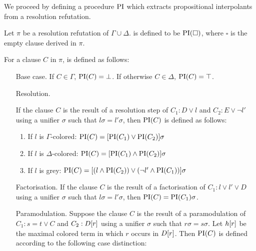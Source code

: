 We proceed by defining a procedure $\operatorname{PI}$ which extracts propositional interpolants from a resolution refutation.

\begin{defi}
	Let $\pi$ be a resolution refutation of $\Gamma \cup \Delta$.
	 is defined to be $\operatorname{PI}(\square)$, where $\square$ is the empty clause derived in $\pi$.

	For a clause $C$ in $\pi$,  is defined as follows:
	\label{def:PI}
	\begin{itemize}
		\item[Base case.]
			If $C \in \Gamma$, $\operatorname{PI}(C) = \bot$. 
			If otherwise $C \in \Delta$, $\operatorname{PI}(C) = \top$. 
		\item[Resolution.]
			\label{def:PI_resolution}

			If the clause $C$ is the result of a resolution step of $C_1: D \lor l$ and $C_2: E \lor \lnot l'$ using a unifier $\sigma$ such that $l\sigma = l'\sigma$, then $\operatorname{PI}(C)$ is defined as follows:
			\begin{enumerate}
				\item If $l$ is $\Gamma$-colored: $\operatorname{PI}(C) = [\operatorname{PI}(C_1) \lor \operatorname{PI}(C_2)]\sigma$
				\item If $l$ is $\Delta$-colored: $\operatorname{PI}(C) = [\operatorname{PI}(C_1) \land \operatorname{PI}(C_2)]\sigma$
				\item If $l$ is grey: $\operatorname{PI}(C) = [(l \land \operatorname{PI}(C_2)) \lor (\lnot l' \land \operatorname{PI}(C_1)) ]\sigma $
			\end{enumerate}

		\item[Factorisation.]
			If the clause $C$ is the result of a factorisation of $C_1: l \lor l' \lor D$ using a unifier $\sigma$ such that $l\sigma = l'\sigma$, then $\operatorname{PI}(C) = \operatorname{PI}(C_1)\sigma$.

		\item[Paramodulation.]
	\label{def:PI_paramod}
			Suppose the clause $C$ is the result of a paramodulation of $C_1: s=t \lor C$ and $C_2: D[r]$ using a unifier $\sigma$ such that $r\sigma = s\sigma$.
			Let $h[r]$ be the maximal colored term in which $r$ occurs in $D[r]$.
			Then $\operatorname{PI}(C)$ is defined according to the following case distinction:
			\begin{enumerate}


\end{enumerate}
\end{itemize}
\end{defi}
